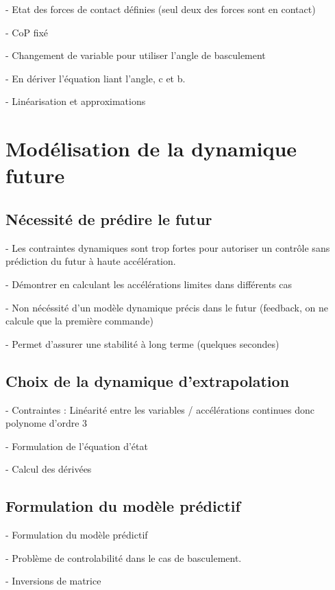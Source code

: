			- Etat des forces de contact définies (seul deux des forces sont en contact)

			- CoP fixé

			- Changement de variable pour utiliser l'angle de basculement
	
			- En dériver l'équation liant l'angle, c et b. 
		
			- Linéarisation et approximations

	\section{Modélisation de la dynamique future}
		\subsection{Nécessité de prédire le futur}

			- Les contraintes dynamiques sont trop fortes pour autoriser un contrôle sans prédiction du futur à haute accélération.

			- Démontrer en calculant les accélérations limites dans différents cas

			- Non nécéssité d'un modèle dynamique précis dans le futur (feedback, on ne calcule que la première commande)

			- Permet d'assurer une stabilité à long terme (quelques secondes)

		\subsection{Choix de la dynamique d'extrapolation}

			- Contraintes : Linéarité entre les variables / accélérations continues donc polynome d'ordre 3

			- Formulation de l'équation d'état

			- Calcul des dérivées

		\subsection{Formulation du modèle prédictif}

			- Formulation du modèle prédictif

			- Problème de controlabilité dans le cas de basculement.

			- Inversions de matrice